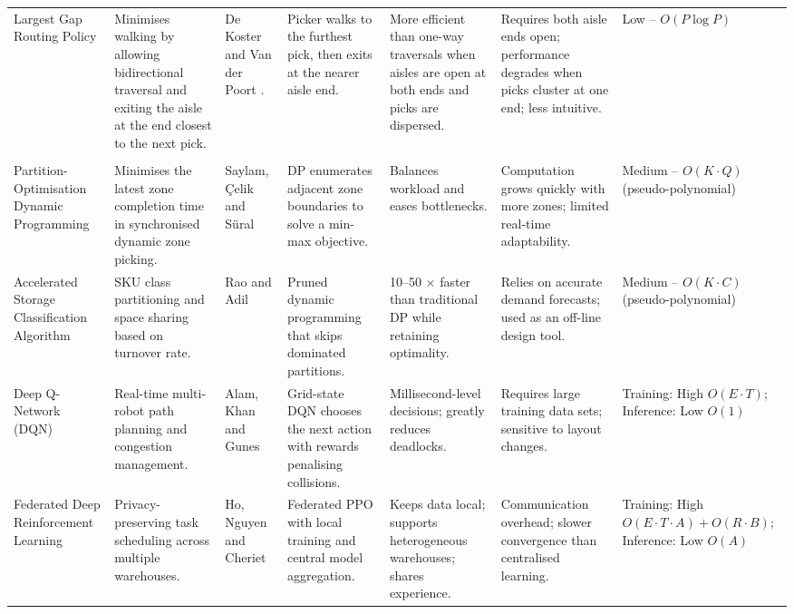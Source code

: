 \documentclass[journal,onecolumn]{IEEEtran}
\begin{document}
\begin{table}[!t]
{\begin{tabular}{p{2.7cm}p{4.9cm}p{3.2cm}p{4.8cm}p{3.8cm}p{4.2cm}p{2.8cm}}
      \\

      Largest Gap Routing Policy &
      Minimises walking by allowing bidirectional traversal and exiting the aisle at the end closest to the next pick. &
      De Koster and Van der Poort \citep{de_koster1997optimal}. &
      Picker walks to the furthest pick, then exits at the nearer aisle end. &
      More efficient than one-way traversals when aisles are open at both ends and picks are dispersed. &
      Requires both aisle ends open; performance degrades when picks cluster at one end; less intuitive. &
      Low -- $O(P\log P)$ \\[2pt]

      \\

      Partition-Optimisation Dynamic Programming &
      Minimises the latest zone completion time in synchronised dynamic zone picking. &
      Saylam, Çelik and Süral \citep{saylam2022partition} &
      DP enumerates adjacent zone boundaries to solve a min-max objective. &
      Balances workload and eases bottlenecks. &
      Computation grows quickly with more zones; limited real-time adaptability. &
      Medium -- $O(K\!\cdot\!Q)$ (pseudo-polynomial) \\[2pt]

      Accelerated Storage Classification Algorithm &
      SKU class partitioning and space sharing based on turnover rate. &
      Rao and Adil \citep{rao2023accelerated} &
      Pruned dynamic programming that skips dominated partitions. &
      10--50 $\times$ faster than traditional DP while retaining optimality. &
      Relies on accurate demand forecasts; used as an off-line design tool. &
      Medium -- $O(K\!\cdot\!C)$ (pseudo-polynomial) \\[2pt]

      Deep Q-Network (DQN) &
      Real-time multi-robot path planning and congestion management. &
      Alam, Khan and Gunes \citep{alam2024dqn} &
      Grid-state DQN chooses the next action with rewards penalising collisions. &
      Millisecond-level decisions; greatly reduces deadlocks. &
      Requires large training data sets; sensitive to layout changes. &
      Training: High $O(E\!\cdot\!T)$; Inference: Low $O(1)$ \\[2pt]

      Federated Deep Reinforcement Learning &
      Privacy-preserving task scheduling across multiple warehouses. &
      Ho, Nguyen and Cheriet \citep{ho2024federated} &
      Federated PPO with local training and central model aggregation. &
      Keeps data local; supports heterogeneous warehouses; shares experience. &
      Communication overhead; slower convergence than centralised learning. &
      Training: High $O(E\!\cdot\!T\!\cdot\!A)+O(R\!\cdot\!B)$; Inference: Low $O(A)$ \\[2pt]


\end{tabular}}
\end{table}
\end{document}
